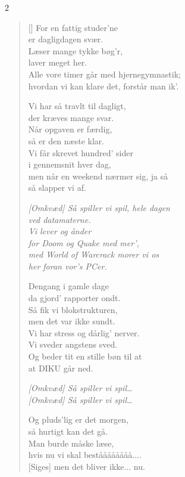 {%
\begin{multicols}2
\settowidth{\versewidth}{men når en weekend nærmer sig, ja så}
\begin{verse}[\versewidth]
For en fattig studer'ne\\
er dagligdagen svær.\\
Læser mange tykke bøg'r,\\
laver meget her.\\
Alle vore timer går med hjernegymnastik;\\
hvordan vi kan klare det, forstår man ik'.

Vi har så travlt til dagligt,\\
der kræves mange svar.\\
Når opgaven er færdig,\\
så er den næste klar.\\
Vi får skrevet hundred' sider\\
i gennemsnit hver dag,\\
men når en weekend nærmer sig, ja så\\
så slapper vi af.

\emph{[Omkvæd] Så spiller vi spil, hele dagen\\
ved datamaterne.\\
Vi lever og ånder\\
for Doom og Quake med mer',\\
med World of Warcrack morer vi os\\
her foran vor's PCer.}

\columnbreak
Dengang i gamle dage\\
da gjord' rapporter ondt.\\
Så fik vi blokstrukturen,\\
men det var ikke sundt.\\
Vi har stress og dårlig' nerver.\\
Vi sveder angstens sved.\\
Og beder tit en stille bøn til at\\
at DIKU går ned.

\emph{[Omkvæd] Så spiller vi spil\ldots}\\
\emph{[Omkvæd] Så spiller vi spil\ldots}

Og pluds'lig er det morgen,\\
så hurtigt kan det gå.\\
Man burde måske læse,\\
hvis nu vi skal beståååååååå....\\
{}[Siges] men det bliver ikke... nu.


\end{verse}
\end{multicols}}
